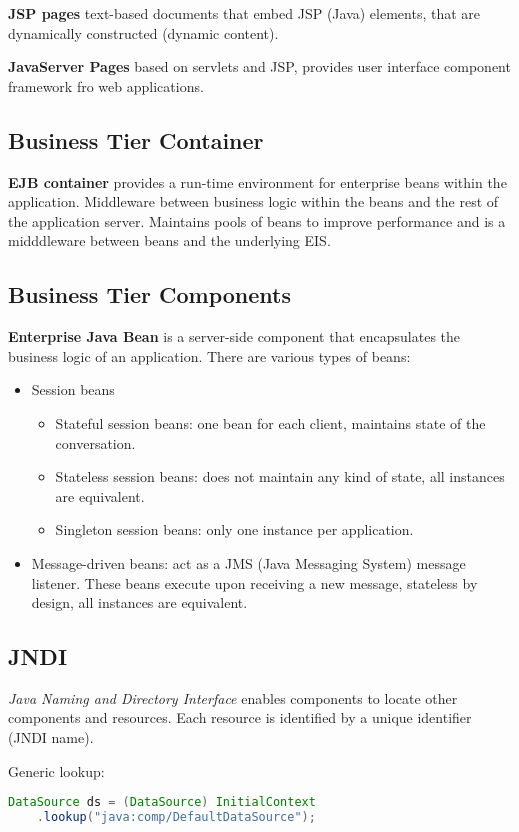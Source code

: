 \textbf{JSP pages} text-based documents that embed JSP (Java) elements, that are dynamically constructed (dynamic content).

\textbf{JavaServer Pages} based on servlets and JSP, provides user interface component framework fro web applications.

\subsection{Business Tier Container}
\textbf{EJB container} provides a run-time environment for enterprise beans within the application. Middleware between business logic within the beans and the rest of the application server. Maintains pools of beans to improve performance and is a midddleware between beans and the underlying EIS.

\subsection{Business Tier Components}
\textbf{Enterprise Java Bean} is a server-side component that encapsulates the business logic of an application.
There are various types of beans:
\begin{itemize}
    \item Session beans
    \begin{itemize}
        \item Stateful session beans: one bean for each client, maintains state of the conversation.
        \item Stateless session beans: does not maintain any kind of state, all instances are equivalent.
        \item Singleton session beans: only one instance per application.
    \end{itemize}
    \item Message-driven beans: act as a JMS (Java Messaging System) message listener. These beans execute upon receiving a new message, stateless by design, all instances are equivalent.
\end{itemize}

\subsection{JNDI}
\emph{Java Naming and Directory Interface} enables components to locate other components and resources.
Each resource is identified by a unique identifier (JNDI name).

Generic lookup:
\begin{lstlisting}[language=Java]
DataSource ds = (DataSource) InitialContext
    .lookup("java:comp/DefaultDataSource");
\end{lstlisting}

